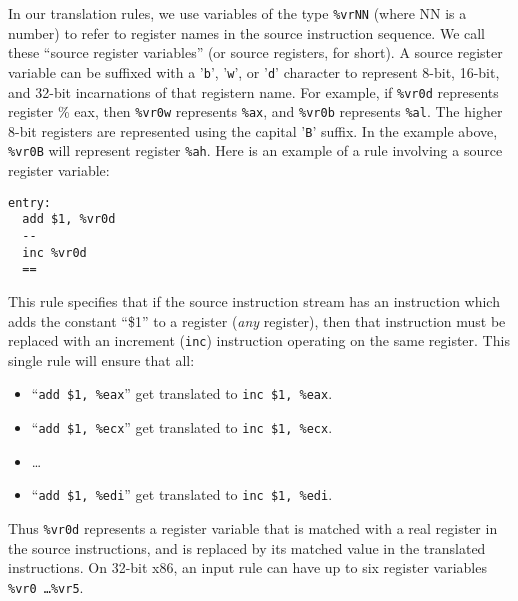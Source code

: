 \documentclass[9pt]{article}
\begin{document}
In our translation rules, we use variables of the
type {\tt \%vrNN} (where NN is a number)
to refer to register names in the source instruction sequence. We call
these ``source register variables'' (or source registers, for short). 
A source register variable can be suffixed with a '{\tt b}', '{\tt w}', or
'{\tt d}' character to represent 8-bit, 16-bit, and 32-bit incarnations
of that registern name. For example, if {\tt \%vr0d} represents
register {\% eax}, then {\tt \%vr0w} represents {\tt \%ax}, and
{\tt \%vr0b} represents {\tt \%al}. The higher 8-bit registers are
represented using the capital '{\tt B}' suffix. In the example above,
{\tt \%vr0B} will represent register {\tt \%ah}. Here is an
example of a rule involving a source register variable:
\begin{verbatim}
entry:
  add $1, %vr0d
  --
  inc %vr0d
  ==
\end{verbatim}
This rule specifies that if the source instruction stream has an
instruction which adds the constant ``\$1'' to a register ({\em any}
register), then that instruction must be replaced with an
increment ({\tt inc}) instruction operating on the same register.
This single rule will ensure that all:
\begin{itemize}
\item ``{\tt add \$1, \%eax}'' get translated to {\tt inc \$1, \%eax}.
\item ``{\tt add \$1, \%ecx}'' get translated to {\tt inc \$1, \%ecx}.
\item \ldots
\item ``{\tt add \$1, \%edi}'' get translated to {\tt inc \$1, \%edi}.
\end{itemize}
Thus {\tt \%vr0d} represents a register variable that is matched with
a real register in the source instructions, and is replaced by its
matched value in the translated instructions. On 32-bit
x86, an input rule can have
up to six register variables {\tt \%vr0 \ldots \%vr5}.
\end{document}
